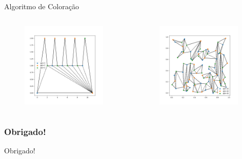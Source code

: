 \documentclass[aspectratio=169,usenames,dvipsnames]{beamer}
\begin{document}
\begin{frame}{Algoritmo de Coloração}
    \begin{columns}
      \begin{center}
        \begin{figure}
        \includegraphics[width=0.95\textwidth]{figures/corn_example_coloring.png}
        \end{figure}
      \end{center}
    \begin{center}
      \begin{figure}
        \includegraphics[width=0.95\textwidth]{figures/caxeiro_color.png}
      \end{figure}
    \end{center}
  \end{columns}
\end{frame}

\begin{frame}
  \frametitle{Obrigado!}
  \begin{center}
    \Huge{Obrigado!}
  \end{center}
\end{frame}
\end{document}
